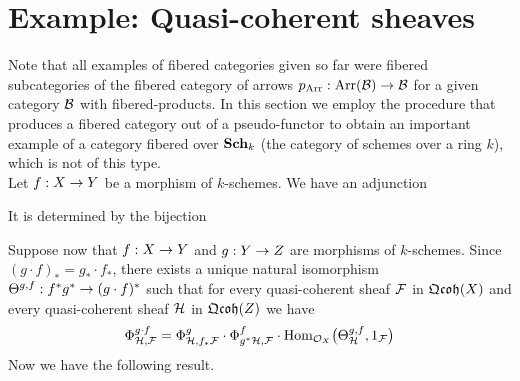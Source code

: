 \section{Example: Quasi-coherent sheaves}
\noindent
Note that all examples of fibered categories given so far were fibered subcategories of the fibered category of arrows $p_{\mathrm{Arr}}:\mathrm{Arr}({\mathcal B})\rightarrow {\mathcal B}$ for a given category ${\mathcal B}$ with fibered-products. In this section we employ the procedure that produces a fibered category out of a pseudo-functor to obtain an important example of a category fibered over $\mathbf{Sch}_k$ (the category of schemes over a ring $k$), which is not of this type.\\
Let $f:X\rightarrow Y$ be a morphism of $k$-schemes. We have an adjunction
\begin{center}   
\end{center}
It is determined by the bijection
\begin{center}
\end{center}
Suppose now that $f:X\rightarrow Y$ and $g:Y\rightarrow Z$ are morphisms of $k$-schemes. Since $(g\cdot f)_* = g_*\cdot f_*$, there exists a unique natural isomorphism $\Theta^{g,f}: f^*g^* \rightarrow (g\cdot f)^*$ such that for every quasi-coherent sheaf ${\mathcal F}$ in $\mathfrak{Qcoh}(X)$ and every quasi-coherent sheaf ${\mathcal H}$ in $\mathfrak{Qcoh}(Z)$ we have
$$\Phi^{g\cdot f}_{{\mathcal H},{\mathcal F}} = \Phi^g_{{\mathcal H},f_*{\mathcal F}}\cdot \Phi^f_{g^*{\mathcal H},{\mathcal F}}  \cdot \mathrm{Hom}_{{\mathcal O}_X}\big(\Theta^{g,f}_{{\mathcal H}},1_{{\mathcal F}}\big)$$
Now we have the following result.

